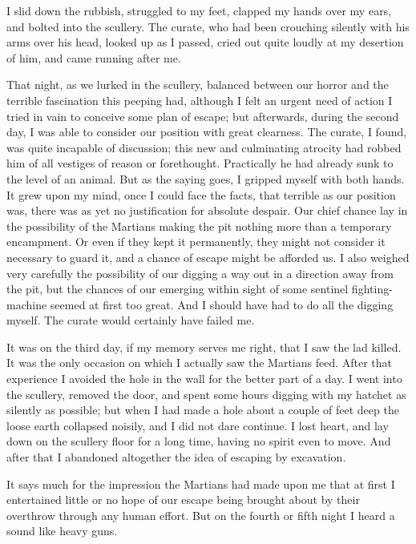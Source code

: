 I slid down the rubbish, struggled to my feet, clapped my hands
over my ears, and bolted into the scullery. The curate, who had
been crouching silently with his arms over his head, looked up as I
passed, cried out quite loudly at my desertion of him, and came
running after me.

That night, as we lurked in the scullery, balanced between our
horror and the terrible fascination this peeping had, although I
felt an urgent need of action I tried in vain to conceive some plan
of escape; but afterwards, during the second day, I was able to
consider our position with great clearness. The curate, I found,
was quite incapable of discussion; this new and culminating
atrocity had robbed him of all vestiges of reason or forethought.
Practically he had already sunk to the level of an animal. But as
the saying goes, I gripped myself with both hands. It grew upon my
mind, once I could face the facts, that terrible as our position
was, there was as yet no justification for absolute despair. Our
chief chance lay in the possibility of the Martians making the pit
nothing more than a temporary encampment. Or even if they kept it
permanently, they might not consider it necessary to guard it, and
a chance of escape might be afforded us. I also weighed very
carefully the possibility of our digging a way out in a direction
away from the pit, but the chances of our emerging within sight of
some sentinel fighting-machine seemed at first too great. And I
should have had to do all the digging myself. The curate would
certainly have failed me.

It was on the third day, if my memory serves me right, that I saw
the lad killed. It was the only occasion on which I actually saw
the Martians feed. After that experience I avoided the hole in the
wall for the better part of a day. I went into the scullery,
removed the door, and spent some hours digging with my hatchet as
silently as possible; but when I had made a hole about a couple of
feet deep the loose earth collapsed noisily, and I did not dare
continue. I lost heart, and lay down on the scullery floor for a
long time, having no spirit even to move. And after that I
abandoned altogether the idea of escaping by excavation.

It says much for the impression the Martians had made upon me that
at first I entertained little or no hope of our escape being
brought about by their overthrow through any human effort. But on
the fourth or fifth night I heard a sound like heavy guns.

